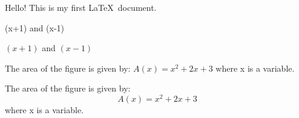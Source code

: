 \documentclass[11pt]{article}
\begin{document}
Hello! This is my first \LaTeX\ document.

(x+1) and (x-1)

$(x+1)$ and $(x-1)$

The area of the figure is given by: {$A(x) = x^2 +2x +3$} where x is a variable.



The area of the figure is given by: $${A(x) = x^2 +2x +3}$$
where x is a variable.
\end{document}
